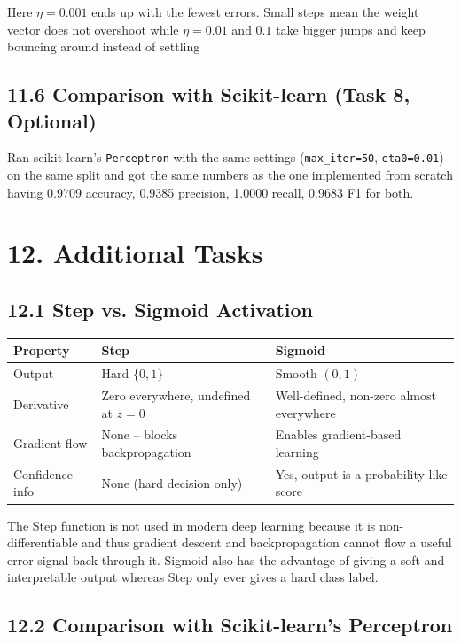 \documentclass[11pt]{article}
\begin{document}
Here $\eta = 0.001$  ends up with the fewest errors. Small steps mean the weight vector does not overshoot while $\eta = 0.01$ and $0.1$ take bigger jumps and keep bouncing around instead of settling
\vspace{0.5cm}
\subsection*{11.6 Comparison with Scikit-learn (Task 8, Optional)}
\vspace{0.5cm}
Ran scikit-learn's \texttt{Perceptron} with the same settings (\texttt{max\_iter=50}, \texttt{eta0=0.01}) on the same split and got the same numbers as the one implemented from scratch having 0.9709 accuracy, 0.9385 precision, 1.0000 recall, 0.9683 F1 for both. %

\section*{12. Additional Tasks}

\subsection*{12.1 Step vs. Sigmoid Activation}

\begin{tabular}{|p{4cm}|p{5.5cm}|p{5.5cm}|}
\hline
\textbf{Property} & \textbf{Step} & \textbf{Sigmoid}\\
\hline
Output & Hard $\{0,1\}$ & Smooth $(0,1)$\\
\hline
Derivative & Zero everywhere, undefined at $z=0$ & Well-defined, non-zero almost everywhere\\
\hline
Gradient flow & None -- blocks backpropagation & Enables gradient-based learning\\
\hline
Confidence info & None (hard decision only) & Yes, output is a probability-like score\\
\hline
\end{tabular}

The Step function is not used in modern deep learning because it is non-differentiable and thus gradient descent and backpropagation cannot flow a useful error signal back through it. Sigmoid also has the advantage of giving a soft and interpretable output whereas Step only ever gives a hard class label.

\vspace{3mm}
\subsection*{12.2 Comparison with Scikit-learn's Perceptron}
\end{document}
